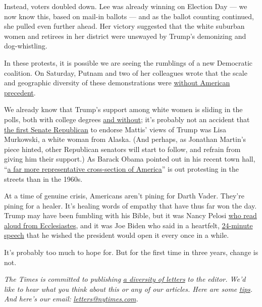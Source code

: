 Instead, voters doubled down. Lee was already winning on Election Day
--- we now know this, based on mail-in ballots --- and as the ballot
counting continued, she pulled even further ahead. Her victory suggested
that the white suburban women and retirees in her district were unswayed
by Trump's demonizing and dog-whistling.

In these protests, it is possible we are seeing the rumblings of a new
Democratic coalition. On Saturday, Putnam and two of her colleagues
wrote that the scale and geographic diversity of these demonstrations
were
\href{https://www.washingtonpost.com/politics/2020/06/06/floyd-protests-are-broadest-us-history-are-spreading-white-small-town-america/}{without
American precedent}.

We already know that Trump's support among white women is sliding in the
polls, both with college degrees
\href{http://rookings.edu/blog/fixgov/2020/06/03/new-polling-eroding-support-from-white-working-class-women-threatens-trumps-reelection}{and
without}; it's probably not an accident that
\href{https://www.nytimes.com/2020/06/04/us/politics/murkowski-mattis-trump.html}{the
first Senate Republican} to endorse Mattis' views of Trump was Lisa
Murkowski, a white woman from Alaska. (And perhaps, as Jonathan Martin's
piece hinted, other Republican senators will start to follow, and
refrain from giving him their support.) As Barack Obama pointed out in
his recent town hall,
``\href{https://www.rev.com/blog/transcripts/barack-obama-speech-transcript-on-george-floyd-death-protests}{a
far more representative cross-section of America}'' is out protesting in
the streets than in the 1960s.

At a time of genuine crisis, Americans aren't pining for Darth Vader.
They're pining for a healer. It's healing words of empathy that have
thus far won the day. Trump may have been fumbling with his Bible, but
it was Nancy Pelosi
\href{https://www.cnn.com/2020/06/02/politics/nancy-pelosi-trump-church-response/index.html}{who
read aloud from Ecclesiastes}, and it was Joe Biden who said in a
heartfelt,
\href{https://www.rev.com/blog/transcripts/joe-biden-philadelphia-speech-transcript-on-protests-for-george-floyd}{24-minute
speech} that he wished the president would open it every once in a
while.

It's probably too much to hope for. But for the first time in three
years, change is not.

\emph{The Times is committed to publishing}
\href{https://www.nytimes.com/2019/01/31/opinion/letters/letters-to-editor-new-york-times-women.html}{\emph{a
diversity of letters}} \emph{to the editor. We'd like to hear what you
think about this or any of our articles. Here are some}
\href{https://help.nytimes.com/hc/en-us/articles/115014925288-How-to-submit-a-letter-to-the-editor}{\emph{tips}}\emph{.
And here's our email:}
\href{mailto:letters@nytimes.com}{\emph{letters@nytimes.com}}\emph{.}

